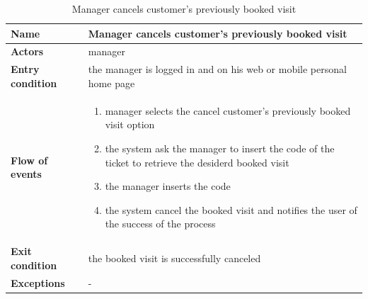 \begin{table}[h!]
    \centering
    \begin{tabular}{@{}P{0.2\textwidth}P{0.70\textwidth}@{}}
        \toprule
        \textbf{Name}                 & Manager cancels customer’s previously booked visit\\
        \midrule
        \textbf{Actors}               & manager\\
        \textbf{Entry condition}      & the manager is logged in and on his web or mobile personal home page\\
        \textbf{Flow of events}       & 
        \begin{enumerate}[nolistsep, leftmargin=*]
            \item manager selects the cancel customer's previously booked visit option 
            \item the system ask the manager to insert the code of the ticket to retrieve the desiderd booked visit
            \item the manager inserts the code
            \item the system cancel the booked visit and notifies the user of the success of the process
        \end{enumerate} \\
        \textbf{Exit condition}       & the booked visit is successfully canceled\\
        \textbf{Exceptions}           
        & -\\
        \bottomrule
    \end{tabular}
\caption{Manager cancels customer’s previously booked visit}
\label{table:managercancelscustomerspreviouslybookedvisit}
\end{table}

